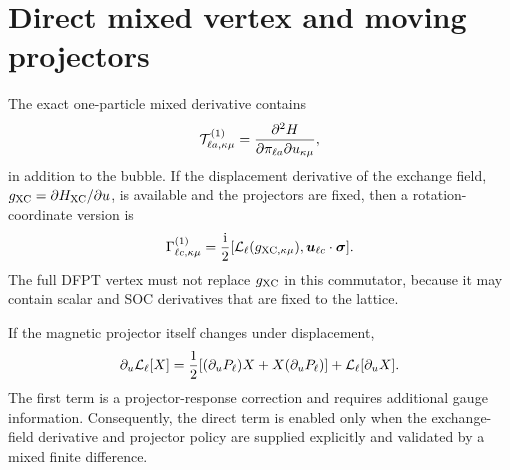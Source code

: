 \section{Direct mixed vertex and moving projectors}
\label{app:direct}

The exact one-particle mixed derivative contains
\begin{equation}
\mathcal T^{(1)}_{\ell a,\kappa\mu}
=\frac{\partial^2H}
{\partial\pi_{\ell a}\partial u_{\kappa\mu}},
\label{eq:direct-vertex}
\end{equation}
in addition to the bubble. If the displacement derivative of the exchange field, $g_{\mathrm{XC}}=\partial H_{\mathrm{XC}}/\partial u$, is available and the projectors are fixed, then a rotation-coordinate version is
\begin{equation}
\Gamma^{(1)}_{\ell c,\kappa\mu}
=\frac{\mathrm{i}}{2}
[\mathcal L_\ell(g_{\mathrm{XC},\kappa\mu}),
 \bm u_{\ell c}\cdot\bm\sigma].
\label{eq:direct-rotation}
\end{equation}
The full DFPT vertex must not replace $g_{\mathrm{XC}}$ in this commutator, because it may contain scalar and SOC derivatives that are fixed to the lattice.

If the magnetic projector itself changes under displacement,
\begin{equation}
\partial_u\mathcal L_\ell[X]
=\frac12[(\partial_uP_\ell)X+X(\partial_uP_\ell)]
+\mathcal L_\ell[\partial_uX].
\label{eq:projector-motion}
\end{equation}
The first term is a projector-response correction and requires additional gauge information. Consequently, the direct term is enabled only when the exchange-field derivative and projector policy are supplied explicitly and validated by a mixed finite difference.
